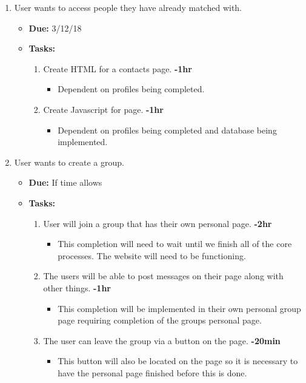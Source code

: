 \documentclass[12pt]{article}
\begin{document}
\begin{enumerate}
    \item User wants to access people they have already matched with.
      \begin{itemize}
        \item \textbf{Due:} 3/12/18
        \item \textbf{Tasks:}
          \begin{enumerate}
            \item Create HTML for a contacts page. \textbf{-1hr}
              \begin{itemize}
                \item Dependent on profiles being completed.
              \end{itemize}
            \item Create Javascript for page. \textbf{-1hr}
              \begin{itemize}
                \item Dependent on profiles being completed and database being implemented.
              \end{itemize}
          \end{enumerate}
      \end{itemize}

    \item User wants to create a group.
      \begin{itemize}
        \item \textbf{Due:} If time allows
        \item \textbf{Tasks:}
          \begin{enumerate}
            \item User will join a group that has their own personal page. \textbf{-2hr}
              \begin{itemize}
                \item This completion will need to wait until we finish all of the core processes. The website will need to be functioning.
              \end{itemize}
            \item The users will be able to post messages on their page along with other things. \textbf{-1hr}
              \begin{itemize}
                \item This completion will be implemented in their own personal group page requiring completion of the groups personal page.
              \end{itemize}
            \item The user can leave the group via a button on the page. \textbf{-20min}
              \begin{itemize}
                \item This button will also be located on the page so it is necessary to have the personal page finished before this is done.
              \end{itemize}
          \end{enumerate}
      \end{itemize}


\end{enumerate}
\end{document}
